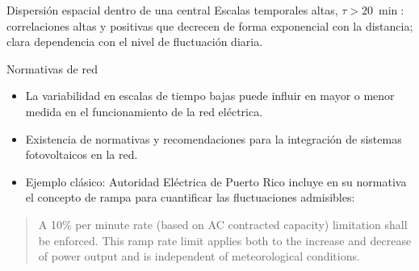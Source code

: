 \documentclass[aspectratio=169, usenames,svgnames,dvipsnames]{beamer}
\begin{document}
\begin{frame}[label={sec:orgded22e6}]{Dispersión espacial dentro de una central}
Escalas temporales altas, \(\tau > \qty{20}{\min}\): correlaciones altas y positivas que decrecen de forma exponencial con la distancia; clara dependencia con el nivel de fluctuación diaria.

\begin{center}
  \end{center}
\end{frame}

\begin{frame}[label={sec:orgf67bf1d}]{Normativas de red}
\begin{itemize}
\item La \alert{variabilidad} en escalas de tiempo bajas \alert{puede influir} en mayor o
menor medida en el \alert{funcionamiento de la red eléctrica}.
\item Existencia de \alert{normativas y recomendaciones} para la integración de
sistemas fotovoltaicos en la red.
\item \alert{Ejemplo clásico}: Autoridad Eléctrica de Puerto Rico incluye en su
normativa el concepto de rampa para cuantificar las fluctuaciones
admisibles:
\end{itemize}

\begin{quote}
A 10\% per minute rate (based on AC contracted capacity) limitation shall be enforced. This ramp rate limit applies both to the increase and decrease of power output and is independent of meteorological conditions.
\end{quote}
\end{frame}
\end{document}
